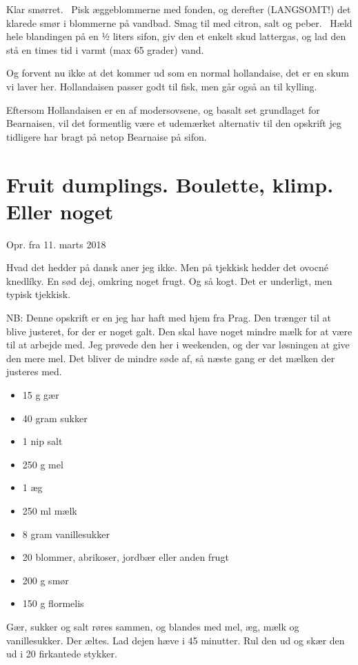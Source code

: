 \documentclass[
]{book}
\providecommand{\tightlist}{%
  \setlength{\itemsep}{0pt}\setlength{\parskip}{0pt}}
\begin{document}
Klar smørret.~
Pisk æggeblommerne med fonden, og derefter (LANGSOMT!) det klarede smør i blommerne på vandbad. Smag til med citron, salt og peber.~
Hæld hele blandingen på en ½ liters sifon, giv den et enkelt skud lattergas, og lad den stå en times tid i varmt (max 65 grader) vand.

Og forvent nu ikke at det kommer ud som en normal hollandaise, det er en skum vi laver her. Hollandaisen passer godt til fisk, men går også an til kylling.

Eftersom Hollandaisen er en af modersovsene, og basalt set grundlaget for Bearnaisen, vil det formentlig være et udemærket alternativ til den opskrift jeg tidligere har bragt på netop Bearnaise på sifon.

\hypertarget{fruit-dumplings.-boulette-klimp.-eller-noget}{%
\section{Fruit dumplings. Boulette, klimp. Eller noget}\label{fruit-dumplings.-boulette-klimp.-eller-noget}}

Opr. fra 11. marts 2018

Hvad det hedder på dansk aner jeg ikke. Men på tjekkisk hedder det ovocné knedlíky. En sød dej, omkring noget frugt. Og så kogt. Det er underligt, men typisk tjekkisk.

NB: Denne opskrift er en jeg har haft med hjem fra Prag. Den trænger til at blive justeret, for der er noget galt. Den skal have noget mindre mælk for at være til at arbejde med. Jeg prøvede den her i weekenden, og der var løsningen at give den mere mel. Det bliver de mindre søde af, så næste gang er det mælken der justeres med.

\begin{itemize}
\tightlist
\item
  15 g gær
\item
  40 gram sukker
\item
  1 nip salt
\item
  250 g mel
\item
  1 æg
\item
  250 ml mælk
\item
  8 gram vanillesukker
\item
  20 blommer, abrikoser, jordbær eller anden frugt
\item
  200 g smør
\item
  150 g flormelis
\end{itemize}

Gær, sukker og salt røres sammen, og blandes med mel, æg, mælk og vanillesukker. Der æltes. Lad dejen hæve i 45 minutter. Rul den ud og skær den ud i 20 firkantede stykker.
\end{document}
